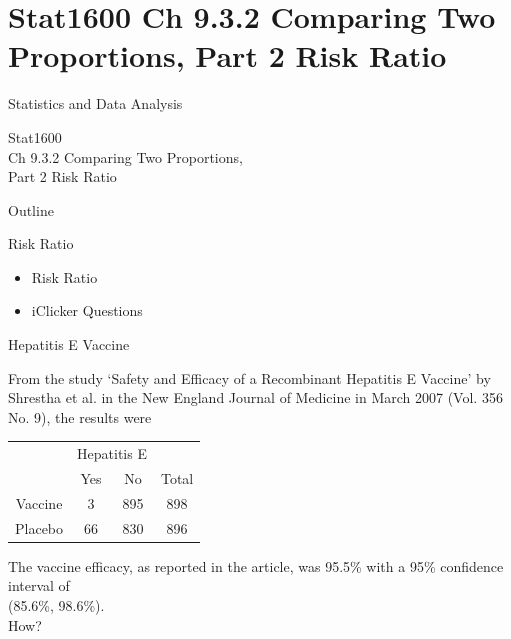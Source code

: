 \documentclass[14pt]{beamer}\usepackage[]{graphicx}\usepackage[]{color}
\begin{document}

\section{Stat1600 Ch 9.3.2 Comparing Two  Proportions, Part 2 Risk Ratio}

\begin{frame}[fragile]{Statistics and Data Analysis}

Stat1600 \\ Ch 9.3.2 Comparing Two  Proportions, \\ Part 2 Risk Ratio

\end{frame}

\begin{frame}[fragile]{Outline}

Risk Ratio  

\begin{itemize}
\item Risk Ratio
\item iClicker Questions
\end{itemize}

\end{frame}

\begin{frame}[fragile]{Hepatitis E Vaccine}

From the study `Safety and Efficacy of a Recombinant Hepatitis E  Vaccine' by Shrestha et al. in the New England Journal of Medicine in  March 2007 (Vol. 356 No. 9), the results were

\begin{tabular}{@{} cccc @{}} \hline
     & \multicolumn{2}{c}{Hepatitis E} \\
     & Yes & No & Total \\ \hline
Vaccine & 3 & 895 & 898 \\
Placebo & 66 & 830 & 896 \\ \hline
\end{tabular}

The vaccine efficacy, as reported in the article, was 95.5\% with a 95\%  confidence interval of \\ (85.6\%, 98.6\%). \\
How?

\end{frame}
\end{document}
